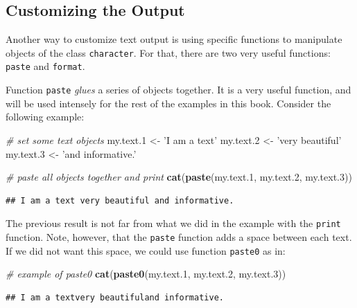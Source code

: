 \documentclass[11pt,]{book}
\newenvironment{Shaded}{\begin{snugshade}}{\end{snugshade}}
\newcommand{\KeywordTok}[1]{\textcolor[rgb]{0.27,0.27,0.27}{\textbf{#1}}}
\newcommand{\DecValTok}[1]{\textcolor[rgb]{0.06,0.06,0.06}{#1}}
\newcommand{\StringTok}[1]{\textcolor[rgb]{0.5,0.5,0.5}{#1}}
\newcommand{\CommentTok}[1]{\textcolor[rgb]{0.56,0.35,0.01}{\textit{#1}}}
\newcommand{\NormalTok}[1]{#1}
\begin{document}
\subsection{Customizing the Output}\label{customizing-the-output}

Another way to customize text output is using specific functions to
manipulate objects of the class \texttt{character}. For that, there are
two very useful functions: \texttt{paste} and \texttt{format}.
 

Function \texttt{paste} \emph{glues} a series of objects together. It is
a very useful function, and will be used intensely for the rest of the
examples in this book. Consider the following example:

\begin{Shaded}
\begin{Highlighting}[]
\CommentTok{# set some text objects}
\NormalTok{my.text.}\DecValTok{1}\NormalTok{ <-}\StringTok{ 'I am a text'}
\NormalTok{my.text.}\DecValTok{2}\NormalTok{ <-}\StringTok{ 'very beautiful'}
\NormalTok{my.text.}\DecValTok{3}\NormalTok{ <-}\StringTok{ 'and informative.'}

\CommentTok{# paste all objects together and print}
\KeywordTok{cat}\NormalTok{(}\KeywordTok{paste}\NormalTok{(my.text.}\DecValTok{1}\NormalTok{, my.text.}\DecValTok{2}\NormalTok{, my.text.}\DecValTok{3}\NormalTok{))}
\end{Highlighting}
\end{Shaded}

\begin{verbatim}
## I am a text very beautiful and informative.
\end{verbatim}

The previous result is not far from what we did in the example with the
\texttt{print} function. Note, however, that the \texttt{paste} function
adds a space between each text. If we did not want this space, we could
use function \texttt{paste0} as in:

\begin{Shaded}
\begin{Highlighting}[]
\CommentTok{# example of paste0}
\KeywordTok{cat}\NormalTok{(}\KeywordTok{paste0}\NormalTok{(my.text.}\DecValTok{1}\NormalTok{, my.text.}\DecValTok{2}\NormalTok{, my.text.}\DecValTok{3}\NormalTok{))}
\end{Highlighting}
\end{Shaded}

\begin{verbatim}
## I am a textvery beautifuland informative.
\end{verbatim}
\end{document}
